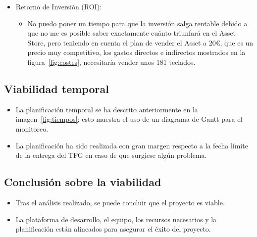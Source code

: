 \begin{itemize}
\begin{itemize}
		\begin{itemize}
			\item Acceso a un mercado creciente de aplicaciones de realidad virtual.
			\item Alto atractivo para la comunidad no anglosajona incluida en los idiomas descritos.
			\item Monetización del teclado a través de la venta directa en Asset Store.
		\end{itemize}
		\item Retorno de Inversión (ROI):
		\begin{itemize}
			\item No puedo poner un tiempo para que la inversión salga rentable debido a que no me es posible saber exactamente cuánto triunfará en el Asset Store, pero teniendo en cuenta el plan de vender el Asset a 20€, que es un precio muy competitivo, los gastos directos e indirectos mostrados en la figura~\ref{fig:costes}, necesitaría vender unos 181 teclados.
		\end{itemize}
	\end{itemize}
\end{itemize}

\subsection{Viabilidad temporal}

\begin{itemize}
	\item La planificación temporal se ha descrito anteriormente en la imagen~\ref{fig:tiempos}; esto muestra el uso de un diagrama de Gantt para el monitoreo.
	\item La planificación ha sido realizada con gran margen respecto a la fecha límite de la entrega del TFG en caso de que surgiese algún problema.	
\end{itemize}

\subsection{Conclusión sobre la viabilidad}

\begin{itemize}
	\item Tras el análisis realizado, se puede concluir que el proyecto es viable.
	\item La plataforma de desarrollo, el equipo, los recursos necesarios y la planificación están alineados para asegurar el éxito del proyecto.
\end{itemize}

